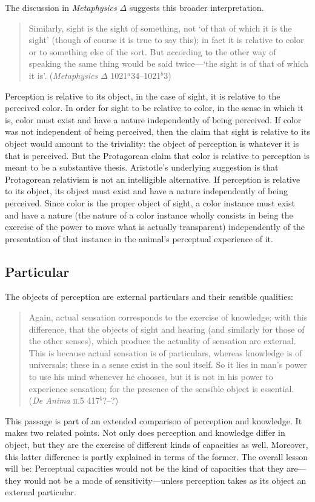 The discussion in \emph{Metaphysics} \( \Delta \) suggests this broader interpretation.
\begin{quote}
	Similarly, sight is the sight of something, not `of that of which it is the sight' (though of course it is true to say this); in fact it is relative to color or to something else of the sort. But according to the other way of speaking the same thing would be said twice---`the sight is of that of which it is'. (\emph{Metaphysics} \( \Delta \) 1021\( ^{a} \)34--1021\( ^{b} \)3)
\end{quote}
Perception is relative to its object, in the case of sight, it is relative to the perceived color. In order for sight to be relative to color, in the sense in which it is, color must exist and have a nature independently of being perceived. If color was not independent of being perceived, then the claim that sight is relative to its object would amount to the triviality: the object of perception is whatever it is that is perceived. But the Protagorean claim that color is relative to perception is meant to be a substantive thesis. Aristotle's underlying suggestion is that Protagorean relativism is not an intelligible alternative. If perception is relative to its object, its object must exist and have a nature independently of being perceived. Since color is the proper object of sight, a color instance must exist and have a nature (the nature of a color instance wholly consists in being the exercise of the power to move what is actually transparent) independently of the presentation of that instance in the animal's perceptual experience of it.



\subsection{Particular} %
\label{sub:particular}
The objects of perception are external particulars and their sensible qualities:
\begin{quote}
	Again, actual sensation corresponds to the exercise of knowledge; with this difference, that the objects of sight and hearing (and similarly for those of the other senses), which produce the actuality of sensation are external. This is because actual sensation is of particulars, whereas knowledge is of universals; these in a sense exist in the soul itself. So it lies in man's power to use his mind whenever he chooses, but it is not in his power to experience sensation; for the presence of the sensible object is essential. (\emph{De Anima} \textsc{ii}.5 417\( ^{b} \)?--?)
\end{quote}
This passage is part of an extended comparison of perception and knowledge. It makes two related points. Not only does perception and knowledge differ in object, but they are the exercise of different kinds of capacities as well. Moreover, this latter difference is partly explained in terms of the former. The overall lesson will be: Perceptual capacities would not be the kind of capacities that they are---they would not be a mode of sensitivity---unless perception takes as its object an external particular.

